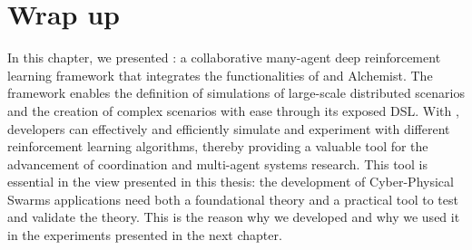 \section{Wrap up}\label{coordination2023:conclusion}
In this chapter, we presented \scarlib{}: 
 a collaborative many-agent deep reinforcement learning framework that integrates the functionalities of \scafi{} and Alchemist.
%
 The framework enables the definition of simulations of large-scale distributed scenarios 
 and the creation of complex scenarios with ease through its exposed DSL. 
% 
With \scarlib{}, developers can effectively and efficiently simulate and experiment with different reinforcement learning algorithms, 
 thereby providing a valuable tool for the advancement of coordination and multi-agent systems research.
This tool is essential in the view presented in this thesis: the development of Cyber-Physical Swarms applications need both a foundational theory and a practical tool to test and validate the theory.
%
This is the reason why we developed \scarlib{} and why we used it in the experiments presented in the next chapter.

%
%
%
